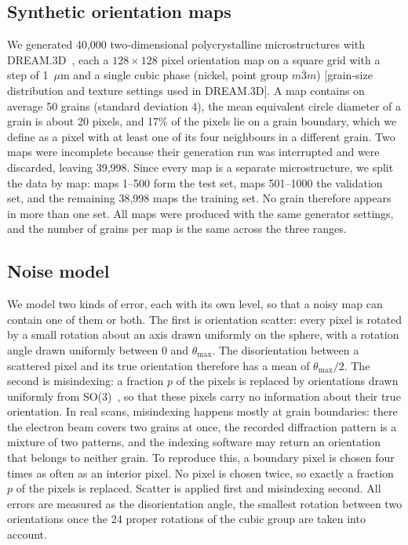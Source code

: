 
\subsection{Synthetic orientation maps}

We generated 40{,}000 two-dimensional polycrystalline microstructures with
DREAM.3D~\cite{groeber2014dream3d}, each a $128 \times 128$ pixel orientation
map on a square grid with a step of 1~$\mu$m and a single cubic phase (nickel,
point group $m\bar{3}m$) [grain-size distribution and texture settings used in
DREAM.3D]. A map contains on average 50 grains (standard deviation 4),
the mean equivalent circle diameter of a grain is about 20 pixels, and 17\% of
the pixels lie on a grain boundary, which we define as a pixel with at least
one of its four neighbours in a different grain. Two maps were incomplete
because their generation run was interrupted and were discarded, leaving
39{,}998. Since every map is a separate microstructure, we split the data by
map: maps 1--500 form the test set, maps 501--1000 the validation set, and
the remaining 38{,}998 maps the training set. No grain therefore appears in more
than one set. All maps were produced with the same generator settings, and the
number of grains per map is the same across the three ranges.

\subsection{Noise model}

We model two kinds of error, each with its own level, so that a noisy map
can contain one of them or both. The first is orientation scatter:
every pixel is rotated by a small rotation about an axis drawn uniformly on the
sphere, with a rotation angle drawn uniformly between $0$ and $\theta_{\max}$.
The disorientation between a
scattered pixel and its true orientation therefore has a mean of
$\theta_{\max}/2$. The second is misindexing: a fraction $p$ of the pixels is
replaced by orientations drawn uniformly from SO(3)~\cite{shoemake1992uniform},
so that these pixels carry no information about their true orientation.
In real scans, misindexing happens mostly at grain boundaries: there the
electron beam covers two grains at once, the recorded diffraction pattern is a
mixture of two patterns, and the indexing software may return an orientation
that belongs to neither grain. To reproduce this, a boundary pixel is chosen
four times as often as an interior pixel. No pixel is chosen twice, so exactly
a fraction $p$ of the pixels is replaced. Scatter is applied first and misindexing
second. All errors are measured as the disorientation angle, the smallest
rotation between two orientations once the 24 proper rotations of the cubic
group are taken into account.

